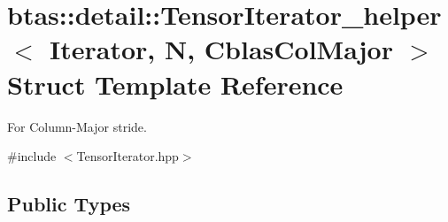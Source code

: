 \hypertarget{structbtas_1_1detail_1_1_tensor_iterator__helper_3_01_iterator_00_01_n_00_01_cblas_col_major_01_4}{
\section{btas::detail::TensorIterator\_\-helper$<$ Iterator, N, CblasColMajor $>$ Struct Template Reference}
\label{structbtas_1_1detail_1_1_tensor_iterator__helper_3_01_iterator_00_01_n_00_01_cblas_col_major_01_4}
}


For Column-\/Major stride.  


{\ttfamily \#include $<$TensorIterator.hpp$>$}\subsection*{Public Types}
